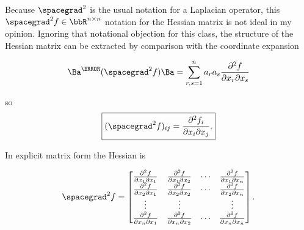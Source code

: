 Because \( \spacegrad^2 \) is the usual notation for a Laplacian operator, this \( \spacegrad^2 f \in \bbR^{n \times n}\) notation for the Hessian matrix is not ideal in my opinion.  Ignoring that notational objection for this class, the structure of the Hessian matrix can be extracted by comparison with the coordinate expansion

\begin{dmath}\label{eqn:jacobianAndHessian:300}
\Ba^\T (\spacegrad^2 f) \Ba
=
\sum_{r,s = 1}^n a_r a_s \frac{\partial^2 f}{\partial x_r \partial x_s}
\end{dmath}

so
\begin{dmath}\label{eqn:jacobianAndHessian:280}
\boxed{
(\spacegrad^2 f)_{ij}
=
\frac{\partial^2 f_i}{\partial x_i \partial x_j}.
}
\end{dmath}

In explicit matrix form the Hessian is

\begin{dmath}\label{eqn:jacobianAndHessian:340}
\spacegrad^2 f
=
\begin{bmatrix}
\frac{\partial^2 f}{\partial x_1 \partial x_1} & \frac{\partial^2 f}{\partial x_1 \partial x_2} & \cdots &\frac{\partial^2 f}{\partial x_1 \partial x_n} \\
\frac{\partial^2 f}{\partial x_2 \partial x_1} & \frac{\partial^2 f}{\partial x_2 \partial x_2} & \cdots &\frac{\partial^2 f}{\partial x_2 \partial x_n} \\
\vdots & \vdots & & \vdots \\
\frac{\partial^2 f}{\partial x_n \partial x_1} & \frac{\partial^2 f}{\partial x_n \partial x_2} & \cdots &\frac{\partial^2 f}{\partial x_n \partial x_n}
\end{bmatrix}.
\end{dmath}

\EndArticle
